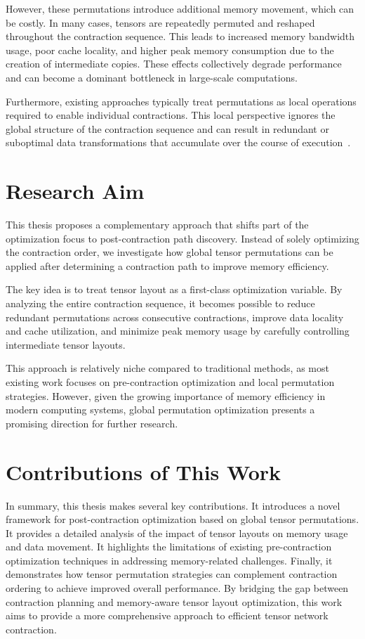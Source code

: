 However, these permutations introduce additional memory movement, which can be costly. In many cases, tensors are repeatedly permuted and reshaped throughout the contraction sequence. This leads to increased memory bandwidth usage, poor cache locality, and higher peak memory consumption due to the creation of intermediate copies. These effects collectively degrade performance and can become a dominant bottleneck in large-scale computations.

Furthermore, existing approaches typically treat permutations as local operations required to enable individual contractions. This local perspective ignores the global structure of the contraction sequence and can result in redundant or suboptimal data transformations that accumulate over the course of execution~\cite{brandejs2026tensor}.

\section{Research Aim}

This thesis proposes a complementary approach that shifts part of the optimization focus to post-contraction path discovery. Instead of solely optimizing the contraction order, we investigate how global tensor permutations can be applied after determining a contraction path to improve memory efficiency.

The key idea is to treat tensor layout as a first-class optimization variable. By analyzing the entire contraction sequence, it becomes possible to reduce redundant permutations across consecutive contractions, improve data locality and cache utilization, and minimize peak memory usage by carefully controlling intermediate tensor layouts.

This approach is relatively niche compared to traditional methods, as most existing work focuses on pre-contraction optimization and local permutation strategies. However, given the growing importance of memory efficiency in modern computing systems, global permutation optimization presents a promising direction for further research.

\section{Contributions of This Work}

In summary, this thesis makes several key contributions. It introduces a novel framework for post-contraction optimization based on global tensor permutations. It provides a detailed analysis of the impact of tensor layouts on memory usage and data movement. It highlights the limitations of existing pre-contraction optimization techniques in addressing memory-related challenges. Finally, it demonstrates how tensor permutation strategies can complement contraction ordering to achieve improved overall performance. By bridging the gap between contraction planning and memory-aware tensor layout optimization, this work aims to provide a more comprehensive approach to efficient tensor network contraction.

